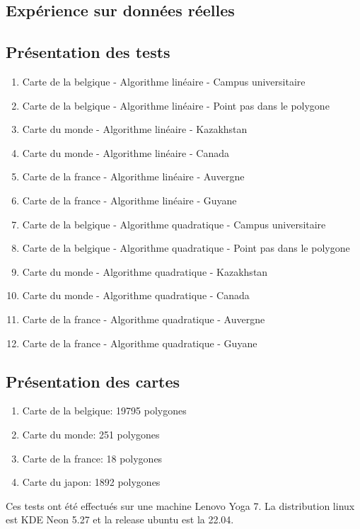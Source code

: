 \documentclass[utf8]{article}
\begin{document}
\begin{large}
  \section{Expérience sur données réelles}
  \subsection{Présentation des tests}
  \begin{enumerate}
    \item Carte de la belgique - Algorithme linéaire - Campus universitaire
    \item Carte de la belgique - Algorithme linéaire - Point pas dans le polygone
    \item Carte du monde - Algorithme linéaire - Kazakhstan
    \item Carte du monde - Algorithme linéaire - Canada
    \item Carte de la france - Algorithme linéaire - Auvergne
    \item Carte de la france - Algorithme linéaire - Guyane
    \item Carte de la belgique - Algorithme quadratique - Campus universitaire
    \item Carte de la belgique - Algorithme quadratique - Point pas dans le polygone
    \item Carte du monde - Algorithme quadratique - Kazakhstan
    \item Carte du monde - Algorithme quadratique - Canada
    \item Carte de la france - Algorithme quadratique - Auvergne
    \item Carte de la france - Algorithme quadratique - Guyane
  \end{enumerate}

  \subsection{Présentation des cartes}
  \begin{enumerate}
    \item Carte de la belgique: 19795 polygones
    \item Carte du monde: 251 polygones
    \item Carte de la france: 18 polygones
    \item Carte du japon: 1892 polygones
  \end{enumerate}

  \indent
  \par
  Ces tests ont été effectués sur une machine Lenovo Yoga 7. La distribution
  linux est KDE Neon 5.27 et la release ubuntu est la 22.04.
  \indent


\end{large}
\end{document}
